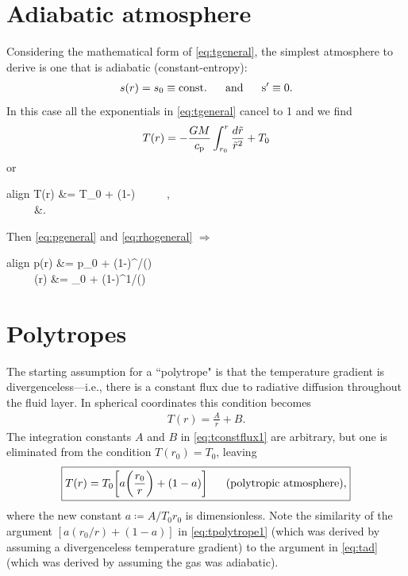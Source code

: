 \documentclass[12pt]{article} %
\newcommand{\bigfrac}[2]{\bigg{(}\frac{#1}{#2}\bigg{)}}
\newcommand{\cp}{c_{\rm{p}}}
\newcommand{\andd}{\text{and}\ \ \ \ \ }
\begin{document}
	\section{Adiabatic atmosphere}
	Considering the mathematical form of \eqref{eq:tgeneral}, the simplest atmosphere to derive is one that is adiabatic (constant-entropy):
	\begin{align}
	s(r)=s_0\equiv\rm{const.} \ \ \ \ \ \andd s^\prime \equiv 0.
	\label{eq:sconst}
	\end{align}
	In this case all the exponentials in \eqref{eq:tgeneral} cancel to 1 and  we find 
	\begin{align*}
	T(r) = -\frac{GM}{\cp}\int_{r_0}^r\frac{d\tilde{r}}{\tilde{r}^2} + T_0
	\end{align*}
	or
	\begin{empheq}[box=\fbox]{align}
	T(r) &= T_0\bigg{[}\bigfrac{r_0}{r} + (1-)\bigg{]}  \ \ \ \ \ ,\label{eq:tad}\\
	 \ \ \ \ \ &\coloneqq \frac{GM}{\cp T_0 r_0}.\label{def:atilde}
	\end{empheq}
	Then \eqref{eq:pgeneral} and \eqref{eq:rhogeneral} $\Longrightarrow$
	\begin{empheq}[box=\fbox]{align}
	p(r) &= p_0 \bigg{[}\bigfrac{r_0}{r} + (1-)\bigg{]}^{\gamma/()} \ \ \ \ \ 
\label{eq:pad}\\
\andd	\rho(r) &= \rho_0 \bigg{[}\bigfrac{r_0}{r} + (1-)\bigg{]}^{1/()} \ \ \ \ \ 
\label{eq:rhoad}
\end{empheq}

\section{Polytropes}
The starting assumption for a ``polytrope" is that the temperature gradient is divergenceless---i.e., there is a constant flux due to radiative diffusion throughout the fluid layer. In 
spherical coordinates this condition becomes
\begin{align}
T(r) = \frac{A}{r} + B.
\label{eq:tconstflux1}
\end{align}
The integration constants $A$ and $B$ in \eqref{eq:tconstflux1} are arbitrary, but one is eliminated from the condition $T(r_0) = T_0$, leaving
\begin{align}
\boxed{
T(r) = T_0 \bigg{[}a\bigg{(}\frac{r_0}{r}\bigg{)} + (1 - a)\bigg{]} \ \ \ \ \ \text{(polytropic atmosphere)},
}
\label{eq:tpolytrope1}
\end{align}
where the new constant $a\coloneqq A/T_0r_0$ is dimensionless. Note the similarity of the argument $[a(r_0/r) + (1-a)]$ in \eqref{eq:tpolytrope1} (which was derived by assuming a divergenceless temperature gradient) to the argument in \eqref{eq:tad} (which was derived by assuming the gas was adiabatic). 
\end{document}
